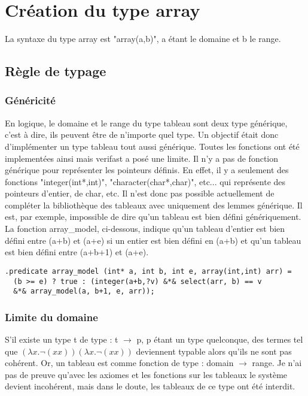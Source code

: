 \documentclass[9pt]{book}
\begin{document}
	\section{Cr\'eation du type array}
		La syntaxe du type array est "array(a,b)", a \'etant le domaine et b le range.
		\subsection{R\`egle de typage}
			\subsubsection{G\'en\'ericit\'e}
			En logique, le domaine et le range du type tableau sont deux type g\'en\'erique, c'est \`a dire, ils peuvent \^etre de n'importe quel type. Un objectif \'etait donc d'impl\'ementer un type tableau tout aussi g\'en\'erique. Toutes les fonctions ont \'et\'e implement\'ees ainsi mais verifast a pos\'e une limite. Il n'y a pas de fonction g\'en\'erique pour repr\'esenter les pointeurs d\'efinis. En effet, il y a seulement des fonctions "integer(int*,int)", "character(char*,char)", etc... qui repr\'esente des pointeurs d'entier, de char, etc. Il n'est donc pas possible actuellement de compl\'eter la biblioth\`eque des tableaux avec uniquement des lemmes g\'en\'erique. Il est, par exemple, impossible de dire qu'un tableau est bien d\'efini g\'en\'eriquement. La fonction array\_model, ci-dessous, indique qu'un tableau d'entier est bien d\'efini entre (a+b) et (a+e) si un entier est bien d\'efini en (a+b) et qu'un tableau est bien d\'efini entre (a+b+1) et (a+e).
\begin{lstlisting}
.predicate array_model (int* a, int b, int e, array(int,int) arr) =
  (b >= e) ? true : (integer(a+b,?v) &*& select(arr, b) == v 
  &*& array_model(a, b+1, e, arr));
\end{lstlisting}
			\subsubsection{Limite du domaine}
			S'il existe un type t de type : t $\rightarrow$ p, p \'etant un type quelconque, des termes tel que $(\lambda x. \neg(xx))(\lambda x.\neg(xx))$ 	deviennent typable alors qu'ils ne sont pas coh\'erent. Or, un tableau est comme fonction de type : domain $\rightarrow$ range. Je n'ai pas de preuve qu'avec les axiomes et les fonctions sur les tableaux le syst\`eme devient incoh\'erent, mais dans le doute, les tableaux de ce type ont \'et\'e interdit.
\end{document}
